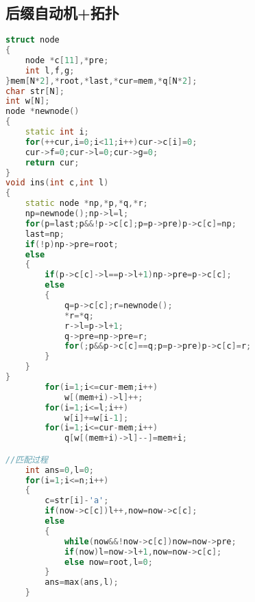 \subsection{后缀自动机+拓扑}
    \begin{lstlisting}[language=c++]
struct node
{
	node *c[11],*pre;
	int l,f,g;
}mem[N*2],*root,*last,*cur=mem,*q[N*2];
char str[N];
int w[N];
node *newnode()
{
	static int i;
	for(++cur,i=0;i<11;i++)cur->c[i]=0;
	cur->f=0;cur->l=0;cur->g=0;
	return cur;
}
void ins(int c,int l)
{
	static node *np,*p,*q,*r;
	np=newnode();np->l=l;
	for(p=last;p&&!p->c[c];p=p->pre)p->c[c]=np;
	last=np;
	if(!p)np->pre=root;
	else
	{
		if(p->c[c]->l==p->l+1)np->pre=p->c[c];
		else
		{
			q=p->c[c];r=newnode();
			*r=*q;
			r->l=p->l+1;
			q->pre=np->pre=r;
			for(;p&&p->c[c]==q;p=p->pre)p->c[c]=r;
		}
	}
}
		for(i=1;i<=cur-mem;i++)
			w[(mem+i)->l]++;
		for(i=1;i<=l;i++)
			w[i]+=w[i-1];
		for(i=1;i<=cur-mem;i++)
			q[w[(mem+i)->l]--]=mem+i;

//匹配过程
	int ans=0,l=0;
	for(i=1;i<=n;i++)
	{
		c=str[i]-'a';
		if(now->c[c])l++,now=now->c[c];
		else
		{
			while(now&&!now->c[c])now=now->pre;
			if(now)l=now->l+1,now=now->c[c];
			else now=root,l=0;
		}
		ans=max(ans,l);
	}
    \end{lstlisting}
